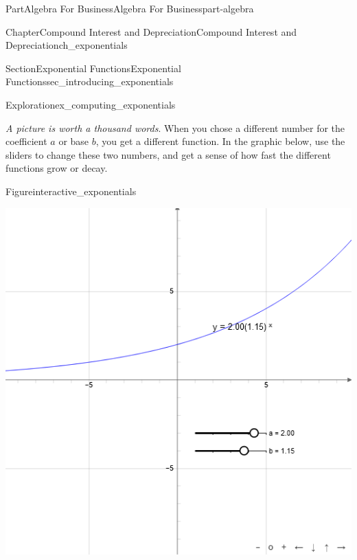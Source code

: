 \documentclass[oneside,10pt,]{tufte-book}
\numberwithin{equation}{chapter}
\begin{document}
\begin{partptx}{Part}{Algebra For Business}{}{Algebra For Business}{}{}{part-algebra}
\begin{chapterptx}{Chapter}{Compound Interest and Depreciation}{}{Compound Interest and Depreciation}{}{}{ch_exponentials}
\begin{sectionptx}{Section}{Exponential Functions}{}{Exponential Functions}{}{}{sec_introducing_exponentials}
\begin{exploration}{Exploration}{}{ex_computing_exponentials}
\begin{enumerate}[font=\bfseries,label=(\alph*),ref=\alph*]
\begin{image}{0.25}{0.5}{0.25}{}
{\begin{tikzpicture}
\end{tikzpicture}
}%
\end{image}%
\end{enumerate}%
\end{exploration}%
\emph{A picture is worth a thousand words}. When you chose a different number for the coefficient \(a\) or base \(b\), you get a different function.  In the graphic below, use the sliders to change these two numbers, and get a sense of how fast the different functions grow or decay.%
\begin{figureptx}{Figure}{}{interactive_exponentials}{}%
\begin{sidebyside}{2}{0.075}{0.075}{0.17}%
\begin{sbspanel}{0.47}%
\includegraphics[width=\linewidth]{external/jsxgraph-algebra-general-exponential.png}
\end{sbspanel}%
\begin{sbspanel}{0.21}%

\end{sbspanel}
\end{sidebyside}
\end{figureptx}
\end{sectionptx}
\end{chapterptx}
\end{partptx}
\end{document}
